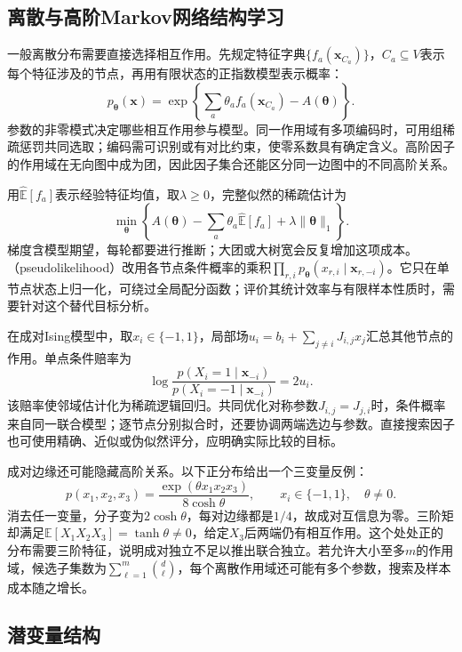 \subsection{离散与高阶Markov网络结构学习}
\label{sec:pgm-structure-learning-discrete}

一般离散分布需要直接选择相互作用。先规定特征字典$\{f_a(\bm{x}_{C_a})\}$，$C_a\subseteq V$表示每个特征涉及的节点，再用有限状态的正指数模型表示概率：
\[
  p_{\bm{\theta}}(\bm{x})
  =\exp\!\left\{\sum_a\theta_a f_a(\bm{x}_{C_a})
                    -A(\bm{\theta})\right\}.
\]
参数的非零模式决定哪些相互作用参与模型。同一作用域有多项编码时，可用组稀疏惩罚共同选取；编码需可识别或有对比约束，使零系数具有确定含义。高阶因子的作用域在无向图中成为团，因此因子集合还能区分同一边图中的不同高阶关系。

用$\widehat{\mathbb{E}}[f_a]$表示经验特征均值，取$\lambda\geq0$，完整似然的稀疏估计为
\[
  \min_{\bm{\theta}}\left\{
    A(\bm{\theta})-\sum_a\theta_a\widehat{\mathbb{E}}[f_a]
      +\lambda\lVert\bm{\theta}\rVert_1\right\}.
\]
梯度含模型期望，每轮都要进行推断；大团或大树宽会反复增加这项成本。（pseudolikelihood）改用各节点条件概率的乘积$\prod_{r,i}p_{\bm{\theta}}(x_{r,i}\mid\bm{x}_{r,-i})$。它只在单节点状态上归一化，可绕过全局配分函数；评价其统计效率与有限样本性质时，需要针对这个替代目标分析。

在成对Ising模型中，取$x_i\in\{-1,1\}$，局部场$u_i=b_i+\sum_{j\ne i}J_{i,j}x_j$汇总其他节点的作用。单点条件赔率为
\[
  \log\frac{p(X_i=1\mid\bm{x}_{-i})}
                {p(X_i=-1\mid\bm{x}_{-i})}=2u_i.
\]
该赔率使邻域估计化为稀疏逻辑回归。共同优化对称参数$J_{i,j}=J_{j,i}$时，条件概率来自同一联合模型；逐节点分别拟合时，还要协调两端选边与参数。直接搜索因子也可使用精确、近似或伪似然评分，应明确实际比较的目标。

成对边缘还可能隐藏高阶关系。以下正分布给出一个三变量反例：
\[
  p(x_1,x_2,x_3)
  =\frac{\exp(\theta x_1x_2x_3)}{8\cosh\theta},
  \qquad x_i\in\{-1,1\},\quad \theta\ne0.
\]
消去任一变量，分子变为$2\cosh\theta$，每对边缘都是$1/4$，故成对互信息为零。三阶矩却满足$\mathbb{E}[X_1X_2X_3]=\tanh\theta\ne0$，给定$X_3$后两端仍有相互作用。这个处处正的分布需要三阶特征，说明成对独立不足以推出联合独立。若允许大小至多$m$的作用域，候选子集数为$\sum_{\ell=1}^{m}\binom d\ell$，每个离散作用域还可能有多个参数，搜索及样本成本随之增长。

\subsection{潜变量结构}
\label{sec:pgm-structure-learning-latent}

